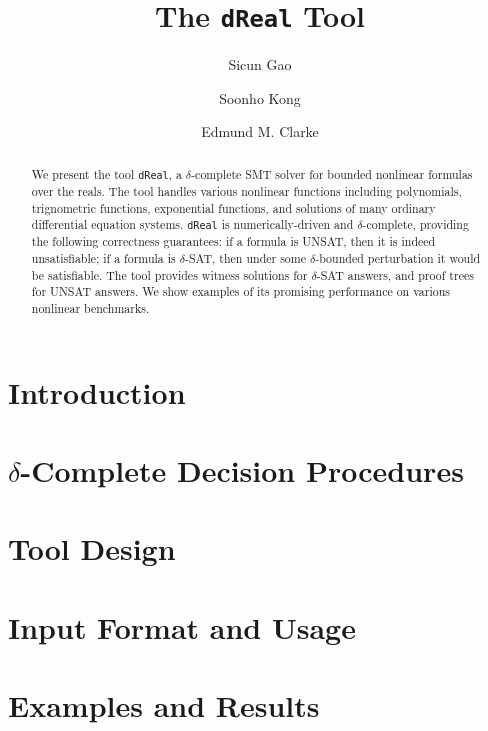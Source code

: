 \documentclass[envcountsect]{llncs}
\title{The {\tt dReal} Tool}
\author{Sicun Gao \and Soonho Kong \and Edmund M. Clarke}
\institute{Carnegie Mellon University, Pittsburgh, PA 15213}
\begin{document}
\maketitle

\begin{abstract}
We present the tool {\tt dReal}, a $\delta$-complete SMT solver for bounded
nonlinear formulas over the reals. The tool handles various nonlinear functions
including polynomials, trignometric functions, exponential functions, and
solutions of many ordinary differential equation systems. {\tt dReal} is
numerically-driven and $\delta$-complete, providing the following correctness
guarantees: if a formula is UNSAT, then it is indeed unsatisfiable; if a
formula is $\delta$-SAT, then under some $\delta$-bounded perturbation it would
be satisfiable. The tool provides witness solutions for $\delta$-SAT answers,
and proof trees for UNSAT answers. We show examples of its promising
performance on various nonlinear benchmarks. 
\end{abstract}

\section{Introduction}

\section{$\delta$-Complete Decision Procedures}

\section{Tool Design}

\section{Input Format and Usage}

\section{Examples and Results}




\end{document}
